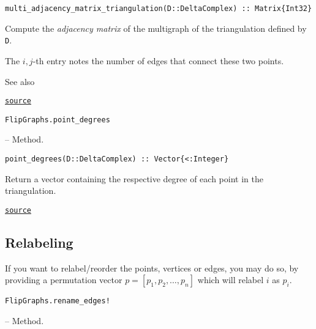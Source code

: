 \begin{adjustwidth}{2em}{0pt}


\begin{verbatim}
multi_adjacency_matrix_triangulation(D::DeltaComplex) :: Matrix{Int32}
\end{verbatim}

Compute the \emph{adjacency matrix} of the multigraph of the triangulation defined by \texttt{D}.

The \(i,j\)-th entry notes the number of edges that connect these two points.

See also 



\href{https://github.com/schto223/FlipGraphs.jl/blob/e35d43698a06b86273148826b79d585ba04fcd26/src/deltaComplex.jl#L464-L472}{\texttt{source}}


\end{adjustwidth}
\hypertarget{12112898979774677454}{\texttt{FlipGraphs.point\_degrees}}  -- {Method.}

\begin{adjustwidth}{2em}{0pt}


\begin{verbatim}
point_degrees(D::DeltaComplex) :: Vector{<:Integer}
\end{verbatim}

Return a vector containing the respective degree of each point in the triangulation.



\href{https://github.com/schto223/FlipGraphs.jl/blob/e35d43698a06b86273148826b79d585ba04fcd26/src/deltaComplex.jl#L1091-L1095}{\texttt{source}}


\end{adjustwidth}

\subsection{Relabeling}



\label{13834926465878219209}{}


If you want to relabel/reorder the points, vertices or edges, you may do so, by providing a permutation vector \(p=[p_1, p_2, \ldots , p_n]\) which will relabel \(i\) as \(p_i\). 


\hypertarget{17900291854214806966}{\texttt{FlipGraphs.rename\_edges!}}  -- {Method.}

